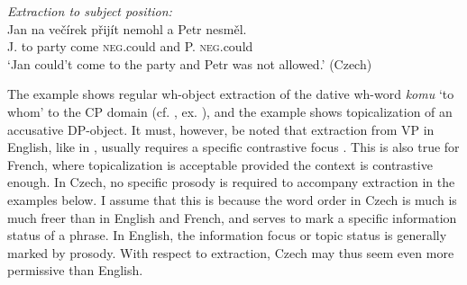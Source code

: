 \documentclass[output=paper,colorlinks,citecolor=brown,
modfonts
]{langscibook}
\begin{document}
\begin{exe}
\ex \label{23}\textit{Extraction to subject position:}\smallskip\\
\gll Jan na večírek přijít  nemohl a Petr nesměl.\\
J.    to  party    come \textsc{neg}.could  and P.    \textsc{neg}.could\\
\glt `Jan could't come to the party and Petr was not allowed.' \hfill (Czech)
\end{exe} 

\noindent The example  shows regular wh-object extraction of the dative wh-word \textit{komu} `to whom' to the CP domain (cf. , ex. ), and the example  shows topicalization of an accusative DP-object. It must, however, be noted that extraction from VP in English, like in , usually requires a specific contrastive focus \citep{Schuyler2001,Lasnik2001,Merchant2008b}. This is also true for French, where topicalization is acceptable provided the context is contrastive enough. In Czech, no specific prosody is required to accompany extraction in the examples below. I assume that this is because the word order in Czech is much is much freer than in English and French, and serves to mark a specific information status of a phrase. In English, the information focus or topic status is generally marked by prosody. With respect to extraction, Czech may thus seem even more permissive than English. 
\end{document}
